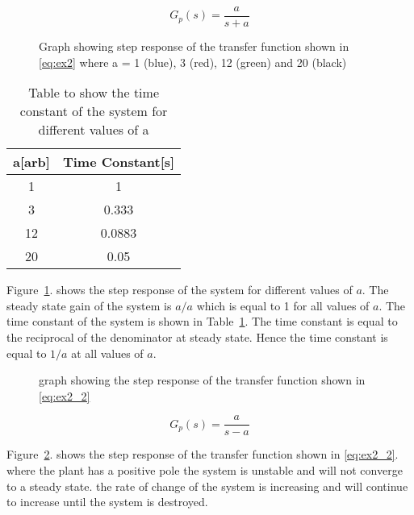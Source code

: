 \renewcommand{\ex}{ex2} 

\begin{equation}
    G_{p}\left(s\right)=\frac{a}{s+a}
    \label{eq:\ex}
\end{equation}

\begin{figure}[ht!]
    \centering
    
    \caption{Graph showing step response of the transfer function shown in \eqref{eq:\ex} where a = 1 (blue), 3 (red), 12 (green) and 20 (black) }
    \label{fig:\ex}
\end{figure}\FloatBarrier

\begin{table}[ht!]
    \centering
    \begin{tabular}{|c|c|}
        \hline
        a{[}arb{]} & Time Constant{[}s{]} \\ \hline
        1          & 1                    \\ \hline
        3          & 0.333                \\ \hline
        12         & 0.0883               \\ \hline
        20         & 0.05                 \\ \hline
    \end{tabular}
    \caption{Table to show the time constant of the system for different values of a}
    \label{tab:\ex}
\end{table}\FloatBarrier

Figure~\ref{fig:\ex}. shows the step response of the system for different values of $a$. The steady state gain of the system is $a/a$ which is equal to 1 for all values of $a$. The time constant of the system is shown in Table~\ref{tab:\ex}. The time constant is equal to the reciprocal of the denominator at steady state. Hence the time constant is equal to $1/a$ at all values of $a$.\\

\begin{figure}[ht!]
    \centering
    
    \caption{graph showing the step response of the transfer function shown in \eqref{eq:\ex_2} }
    \label{fig:\ex_2}
\end{figure}\FloatBarrier

\begin{equation}
    G_{p}\left(s\right)=\frac{a}{s-a}
    \label{eq:\ex_2}
\end{equation}

Figure~\ref{fig:\ex_2}. shows the step response of the transfer function shown in \eqref{eq:\ex_2}. where the plant has a positive pole the system is unstable and will not converge to a steady state. the rate of change of the system is increasing and will continue to increase until the system is destroyed. 

